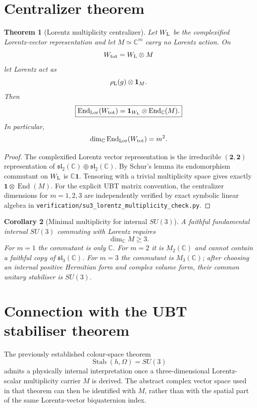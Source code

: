 \documentclass[11pt,a4paper]{article}
\newtheorem{theorem}{Theorem}
\newtheorem{corollary}[theorem]{Corollary}
\begin{document}
\section{Centralizer theorem}

\begin{theorem}[Lorentz multiplicity centralizer]
Let $W_{\rm L}$ be the complexified Lorentz-vector representation and let
$M\simeq\mathbb C^m$ carry no Lorentz action. On
\[
 W_{\rm tot}=W_{\rm L}\otimes M
\]
let Lorentz act as
\[
 \rho_{\rm L}(g)\otimes\mathbf1_M.
\]
Then
\[
 \boxed{
 \operatorname{End}_{\rm Lor}(W_{\rm tot})
 =\mathbf1_{W_{\rm L}}\otimes\operatorname{End}_{\mathbb C}(M).
 }
\]
In particular,
\[
 \dim_{\mathbb C}\operatorname{End}_{\rm Lor}(W_{\rm tot})=m^2.
\]
\end{theorem}

\begin{proof}
The complexified Lorentz vector representation is the irreducible
$(\mathbf2,\mathbf2)$ representation of
$\mathfrak{sl}_2(\mathbb C)\oplus\mathfrak{sl}_2(\mathbb C)$.
By Schur's lemma its endomorphism commutant on $W_{\rm L}$ is
$\mathbb C\mathbf1$. Tensoring with a trivial multiplicity space gives
exactly $\mathbf1\otimes\operatorname{End}(M)$.
For the explicit UBT matrix convention, the centralizer dimensions for
$m=1,2,3$ are independently verified by exact symbolic linear algebra in
\texttt{verification/su3\_lorentz\_multiplicity\_check.py}.
\end{proof}

\begin{corollary}[Minimal multiplicity for internal $SU(3)$]
A faithful fundamental internal $SU(3)$ commuting with Lorentz requires
\[
 \boxed{\dim_{\mathbb C}M\ge3.}
\]
For $m=1$ the commutant is only $\mathbb C$. For $m=2$ it is
$M_2(\mathbb C)$ and cannot contain a faithful copy of
$\mathfrak{sl}_3(\mathbb C)$. For $m=3$ the commutant is
$M_3(\mathbb C)$; after choosing an internal positive Hermitian form and
complex volume form, their common unitary stabiliser is $SU(3)$.
\end{corollary}

\section{Connection with the UBT stabiliser theorem}

The previously established colour-space theorem
\[
 \operatorname{Stab}(h,\Omega)=SU(3)
\]
admits a physically internal interpretation once a three-dimensional
Lorentz-scalar multiplicity carrier $M$ is derived. The abstract complex
vector space used in that theorem can then be identified with $M$, rather than
with the spatial part of the same Lorentz-vector biquaternion index.
\end{document}
